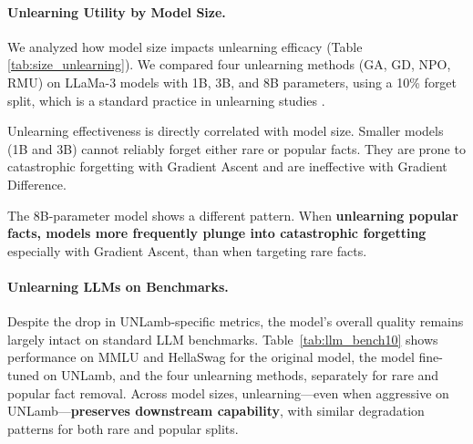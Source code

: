 \documentclass[11pt]{article}
\begin{document}
{\paragraph{Unlearning Utility by Model Size.}
We analyzed how model size impacts unlearning efficacy (Table \ref{tab:size_unlearning}). We compared four unlearning methods (GA, GD, NPO, RMU) on LLaMa-3 models with 1B, 3B, and 8B parameters, using a 10\% forget split, which is a standard practice in unlearning studies \cite{tofu2024, pal2025llm}.

Unlearning effectiveness is directly correlated with model size. Smaller models (1B and 3B) cannot reliably forget either rare or popular facts. They are prone to catastrophic forgetting with Gradient Ascent and are ineffective with Gradient Difference.

The 8B-parameter model shows a different pattern. When \textbf{unlearning popular facts, models more frequently plunge into catastrophic forgetting} especially with Gradient Ascent, than when targeting rare facts.




\paragraph{Unlearning LLMs on Benchmarks.}

Despite the drop in UNLamb-specific metrics, the model’s overall quality remains largely intact on standard LLM benchmarks. Table~\ref{tab:llm_bench10} shows performance on MMLU and HellaSwag for the original model, the model fine-tuned on UNLamb, and the four unlearning methods, separately for rare and popular fact removal. Across model sizes, unlearning—even when aggressive on UNLamb—\textbf{preserves downstream capability}, with similar degradation patterns for both rare and popular splits.







}
\end{document}
